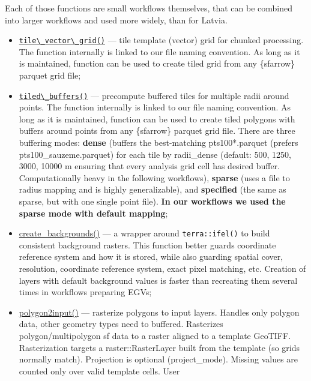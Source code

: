 \documentclass[
]{book}
\newcommand{\passthrough}[1]{#1}
\begin{document}
Each of those functions are small workflows themselves, that can be combined
into larger workflows and used more widely, than for Latvia.

\begin{itemize}
\item
  \href{https://aavotins.github.io/egvtools/reference/tile_vector_grid.html}{\passthrough{\lstinline!tile\_vector\_grid()!}} --- tile template (vector) grid for chunked processing. The function internally is linked to our file naming
  convention. As long as it is maintained, function can be used to create tiled grid
  from any \{sfarrow\} parquet grid file;
\item
  \href{https://aavotins.github.io/egvtools/reference/tiled_buffers.html}{\passthrough{\lstinline!tiled\_buffers()!}} ---
  precompute buffered tiles for multiple radii around
  points. The function internally is linked to our file naming
  convention. As long as it is maintained, function can be used to create tiled
  polygons with buffers around points from any \{sfarrow\} parquet grid file. There
  are three buffering modes: \textbf{dense} (buffers the best-matching pts100*.parquet
  (prefers pts100\_sauzeme.parquet) for each tile by radii\_dense (default: 500,
  1250, 3000, 10000 m ensuring that every analysis grid cell has desired buffer.
  Computationally heavy in the following workflows), \textbf{sparse} (uses a file to
  radius mapping and is highly generalizable),
  and \textbf{specified} (the same as sparse, but with one single
  point file). \textbf{In our workflows we used the sparse mode with default mapping};
\item
  \href{https://aavotins.github.io/egvtools/reference/create_backgrounds.html}{create\_backgrounds()} --- a wrapper
  around \passthrough{\lstinline!terra::ifel()!} to build consistent background rasters. This function better
  guards coordinate reference system and how it is stored, while also guarding
  spatial cover, resolution, coordinate reference system, exact pixel matching, etc.
  Creation of layers with default background values is faster than recreating them
  several times in workflows preparing EGVs;
\item
  \href{}{polygon2input()} --- rasterize polygons to input layers. Handles only polygon data,
  other geometry types need to buffered. Rasterizes polygon/multipolygon sf data to
  a raster aligned to a template GeoTIFF. Rasterization targets a raster::RasterLayer
  built from the template (so grids normally match). Projection is optional
  (project\_mode). Missing values are counted only over valid template cells. User

\end{itemize}
\end{document}
